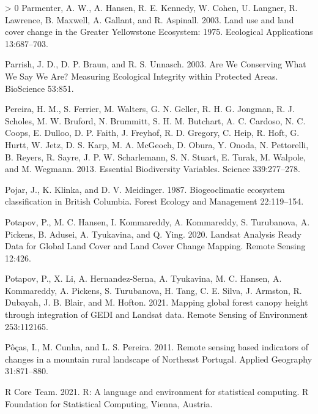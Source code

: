 \documentclass[11pt]{article}
\newlength{\cslhangindent}
\newenvironment{CSLReferences}[3] %
 {%
  \setlength{\parindent}{0pt}
  \ifodd #1 \everypar{\setlength{\hangindent}{\cslhangindent}}\ignorespaces\fi
  \ifnum #2 > 0
  \setlength{\parskip}{#2\baselineskip}
  \fi
 }%
 {}
\begin{document}
\begin{CSLReferences}{1}{0}
\leavevmode\hypertarget{ref-parmenterLandUseLand2003}{}%
Parmenter, A. W., A. Hansen, R. E. Kennedy, W. Cohen, U. Langner, R.
Lawrence, B. Maxwell, A. Gallant, and R. Aspinall. 2003. Land use and
land cover change in the Greater Yellowstone Ecosystem: 1975. Ecological
Applications 13:687--703.

\leavevmode\hypertarget{ref-parrishAreWeConserving2003}{}%
Parrish, J. D., D. P. Braun, and R. S. Unnasch. 2003. Are We Conserving
What We Say We Are? Measuring Ecological Integrity within Protected
Areas. BioScience 53:851.

\leavevmode\hypertarget{ref-pereira2013}{}%
Pereira, H. M., S. Ferrier, M. Walters, G. N. Geller, R. H. G. Jongman,
R. J. Scholes, M. W. Bruford, N. Brummitt, S. H. M. Butchart, A. C.
Cardoso, N. C. Coops, E. Dulloo, D. P. Faith, J. Freyhof, R. D. Gregory,
C. Heip, R. Hoft, G. Hurtt, W. Jetz, D. S. Karp, M. A. McGeoch, D.
Obura, Y. Onoda, N. Pettorelli, B. Reyers, R. Sayre, J. P. W.
Scharlemann, S. N. Stuart, E. Turak, M. Walpole, and M. Wegmann. 2013.
Essential Biodiversity Variables. Science 339:277--278.

\leavevmode\hypertarget{ref-pojarBiogeoclimaticEcosystemClassification1987}{}%
Pojar, J., K. Klinka, and D. V. Meidinger. 1987. Biogeoclimatic
ecosystem classification in British Columbia. Forest Ecology and
Management 22:119--154.

\leavevmode\hypertarget{ref-potapovLandsatAnalysisReady2020}{}%
Potapov, P., M. C. Hansen, I. Kommareddy, A. Kommareddy, S. Turubanova,
A. Pickens, B. Adusei, A. Tyukavina, and Q. Ying. 2020. Landsat Analysis
Ready Data for Global Land Cover and Land Cover Change Mapping. Remote
Sensing 12:426.

\leavevmode\hypertarget{ref-potapovMappingGlobalForest2021}{}%
Potapov, P., X. Li, A. Hernandez-Serna, A. Tyukavina, M. C. Hansen, A.
Kommareddy, A. Pickens, S. Turubanova, H. Tang, C. E. Silva, J. Armston,
R. Dubayah, J. B. Blair, and M. Hofton. 2021. Mapping global forest
canopy height through integration of GEDI and Landsat data. Remote
Sensing of Environment 253:112165.

\leavevmode\hypertarget{ref-puxf4uxe7as2011}{}%
Pôças, I., M. Cunha, and L. S. Pereira. 2011. Remote sensing based
indicators of changes in a mountain rural landscape of Northeast
Portugal. Applied Geography 31:871--880.

\leavevmode\hypertarget{ref-R-base}{}%
R Core Team. 2021. R: A language and environment for statistical
computing. R Foundation for Statistical Computing, Vienna, Austria.


\end{CSLReferences}
\end{document}
